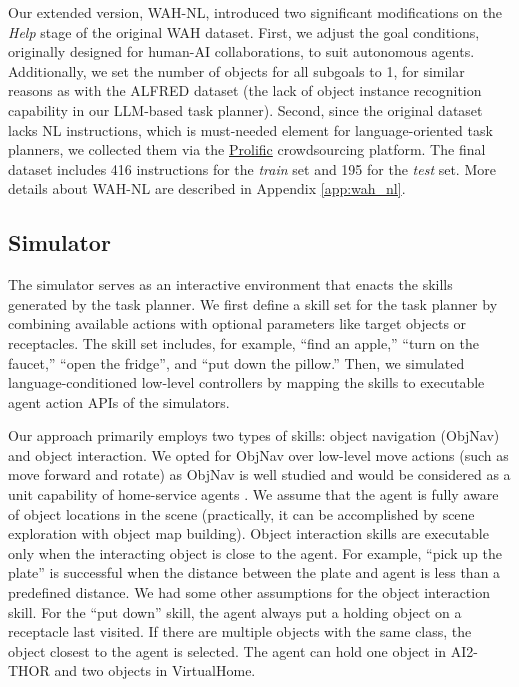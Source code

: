 Our extended version, WAH-NL, introduced two significant modifications on the \textit{Help} stage of the original WAH dataset. First, we adjust the goal conditions, originally designed for human-AI collaborations, to suit autonomous agents. 
Additionally, we set the number of objects for all subgoals to 1, for similar reasons as with the ALFRED dataset (the lack of object instance recognition capability in our LLM-based task planner). Second, since the original dataset lacks NL instructions, which is must-needed element for language-oriented task planners, we collected them via the \href{https://www.prolific.co/}{Prolific} crowdsourcing platform. The final dataset includes 416 instructions for the \textit{train} set and 195 for the \textit{test} set. More details about WAH-NL are described in Appendix \ref{app:wah_nl}.

\subsection{Simulator}
\label{subsec:simulator}
The simulator serves as an interactive environment that enacts the skills generated by the task planner. We first define a skill set for the task planner by combining available actions with optional parameters like target objects or receptacles. The skill set includes, for example, ``find an apple,'' ``turn on the faucet,'' ``open the fridge'', and ``put down the pillow.'' Then, we simulated language-conditioned low-level controllers by mapping the skills to executable agent action APIs of the simulators.
    
Our approach primarily employs two types of skills: object navigation (ObjNav) and object interaction. We opted for ObjNav over low-level move actions (such as move forward and rotate) as ObjNav is well studied and would be considered as a unit capability of home-service agents \citep{9687596}. We assume that the agent is fully aware of object locations in the scene (practically, it can be accomplished by scene exploration with object map building). Object interaction skills are executable only when the interacting object is close to the agent. For example, ``pick up the plate'' is successful when the distance between the plate and agent is less than a predefined distance. 
We had some other assumptions for the object interaction skill. 
For the ``put down'' skill, the agent always put a holding object on a receptacle last visited. If there are multiple objects with the same class, the object closest to the agent is selected. The agent can hold one object in AI2-THOR and two objects in VirtualHome.
    
